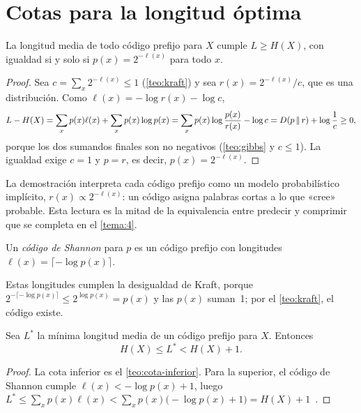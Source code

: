 \section{Cotas para la longitud óptima}

\begin{teorema}\label{teo:cota-inferior}
La longitud media de todo código prefijo para $X$ cumple $L\ge H(X)$, con igualdad si y solo si $p(x)=2^{-\ell(x)}$ para todo $x$.
\end{teorema}

\begin{proof}
Sea $c=\sum_x2^{-\ell(x)}\le 1$ (\cref{teo:kraft}) y sea $r(x)=2^{-\ell(x)}/c$, que es una distribución. Como $\ell(x)=-\log r(x)-\log c$,
\[
L-H(X)=\sum_x p(x)\ell(x)+\sum_xp(x)\log p(x)=\sum_xp(x)\log\frac{p(x)}{r(x)}-\log c=D(p\,\|\,r)+\log\frac1c\ge 0,
\]
porque los dos sumandos finales son no negativos (\cref{teo:gibbs} y $c\le 1$). La igualdad exige $c=1$ y $p=r$, es decir, $p(x)=2^{-\ell(x)}$.
\end{proof}

La demostración interpreta cada código prefijo como un modelo probabilístico implícito, $r(x)\propto2^{-\ell(x)}$: un código asigna palabras cortas a lo que «cree» probable. Esta lectura es la mitad de la equivalencia entre predecir y comprimir que se completa en el \cref{tema:4}.

\begin{definicion}\label{def:shannon}
Un \emph{código de Shannon} para $p$ es un código prefijo con longitudes $\ell(x)=\lceil-\log p(x)\rceil$.
\end{definicion}

Estas longitudes cumplen la desigualdad de Kraft, porque $2^{-\lceil-\log p(x)\rceil}\le2^{\log p(x)}=p(x)$ y las $p(x)$ suman~1; por el \cref{teo:kraft}, el código existe.

\begin{teorema}\label{teo:cotas}
Sea $L^{*}$ la mínima longitud media de un código prefijo para $X$. Entonces
\[
H(X)\le L^{*}<H(X)+1.
\]
\end{teorema}

\begin{proof}
La cota inferior es el \cref{teo:cota-inferior}. Para la superior, el código de Shannon cumple $\ell(x)<-\log p(x)+1$, luego $L^{*}\le\sum_xp(x)\ell(x)<\sum_xp(x)\bigl(-\log p(x)+1\bigr)=H(X)+1$~\cite[§5.4]{ct}.
\end{proof}

